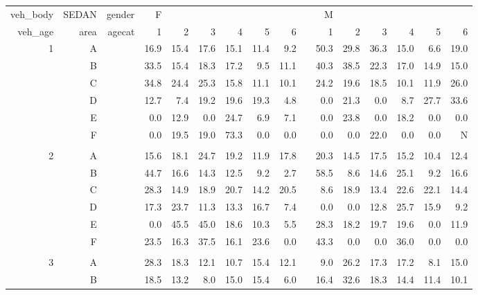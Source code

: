 \documentclass[12pt]{article}
\begin{document}
\begin{sidewaysfigure} %
\begin{center}
\begin{tabular}{rr|rrrrrrrrrrrrrr}
\hline
veh\_body&SEDAN& gender & F &&&&&&& M &&&&& \\
veh\_age & area & agecat & 1 & 2 & 3 & 4 & 5 & 6 & & 1 & 2 & 3 & 4 & 5 & 6 \\ \hline \hline
%
1 & A & & 16.9  & 15.4  & 17.6  & 15.1  & 11.4  & 9.2   && 50.3  & 29.8  & 36.3  & 15.0  & 6.6   & 19.0  \\
  & B & & 33.5  & 15.4  & 18.3  & 17.2  & 9.5   & 11.1  && 40.3  & 38.5  & 22.3  & 17.0  & 14.9  & 15.0  \\
  & C & & 34.8  & 24.4  & 25.3  & 15.8  & 11.1  & 10.1  && 24.2  & 19.6  & 18.5  & 10.1  & 11.9  & 26.0  \\
  & D & & 12.7  & 7.4   & 19.2  & 19.6  & 19.3  & 4.8   && 0.0   & 21.3  & 0.0   & 8.7   & 27.7  & 33.6  \\
  & E & & 0.0   & 12.9  & 0.0   & 24.7  & 6.9   & 7.1   && 0.0   & 23.8  & 0.0   & 18.2  & 0.0   & 0.0   \\
  & F & & 0.0   & 19.5  & 19.0  & 73.3  & 0.0   & 0.0   && 0.0   & 0.0   & 22.0  & 0.0   & 0.0   & N     \\ & \\
2 & A & & 15.6  & 18.1  & 24.7  & 19.2  & 11.9  & 17.8  && 20.3  & 14.5  & 17.5  & 15.2  & 10.4  & 12.4  \\
  & B & & 44.7  & 16.6  & 14.3  & 12.5  & 9.2   & 2.7   && 58.5  & 8.6   & 14.6  & 25.1  & 9.2   & 16.6  \\
  & C & & 28.3  & 14.9  & 18.9  & 20.7  & 14.2  & 20.5  && 8.6   & 18.9  & 13.4  & 22.6  & 22.1  & 14.4  \\
  & D & & 17.3  & 23.7  & 11.3  & 13.3  & 16.7  & 7.4   && 0.0   & 0.0   & 12.8  & 25.7  & 15.9  & 9.2   \\
  & E & & 0.0   & 45.5  & 45.0  & 18.6  & 10.3  & 5.5   && 28.3  & 18.2  & 19.7  & 19.6  & 0.0   & 11.9  \\
  & F & & 23.5  & 16.3  & 37.5  & 16.1  & 23.6  & 0.0   && 43.3  & 0.0   & 0.0   & 36.0  & 0.0   & 0.0   \\ & \\
3 & A & & 28.3  & 18.3  & 12.1  & 10.7  & 15.4  & 12.1  && 9.0   & 26.2  & 17.3  & 17.2  & 8.1   & 15.0  \\
  & B & & 18.5  & 13.2  & 8.0   & 15.0  & 15.4  & 6.0   && 16.4  & 32.6  & 18.3  & 14.4  & 11.4  & 10.1  \\

\end{tabular}
\end{center}
\end{sidewaysfigure}
\end{document}
